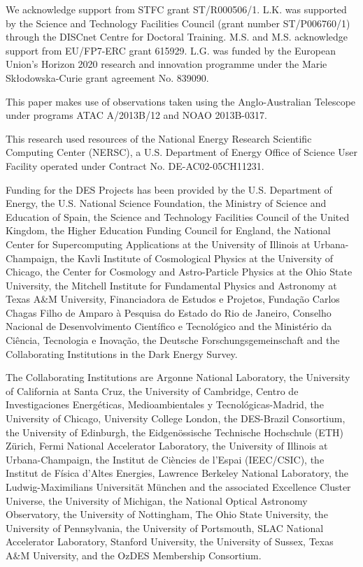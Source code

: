 \documentclass[fleqn,usenatbib,]{mnras}
\begin{document}
We acknowledge support from STFC grant ST/R000506/1. L.K. was supported by the Science and Technology Facilities Council (grant number ST/P006760/1) through the DISCnet Centre for Doctoral Training. M.S. and M.S. acknowledge support from EU/FP7-ERC grant 615929. L.G. was funded by the European Union's Horizon 2020 research and innovation programme under the Marie Sk\l{}odowska-Curie grant agreement No. 839090.

This paper makes use of observations taken using the Anglo-Australian Telescope under programs ATAC A/2013B/12 and NOAO 2013B-0317.

This research used resources of the National Energy Research Scientific Computing Center (NERSC), a U.S. Department of Energy Office of Science User Facility operated under Contract No. DE-AC02-05CH11231.

Funding for the DES Projects has been provided by the U.S. Department of Energy, the U.S. National Science Foundation, the Ministry of Science and Education of Spain, 
the Science and Technology Facilities Council of the United Kingdom, the Higher Education Funding Council for England, the National Center for Supercomputing 
Applications at the University of Illinois at Urbana-Champaign, the Kavli Institute of Cosmological Physics at the University of Chicago, 
the Center for Cosmology and Astro-Particle Physics at the Ohio State University,
the Mitchell Institute for Fundamental Physics and Astronomy at Texas A\&M University, Financiadora de Estudos e Projetos, 
Funda{\c c}{\~a}o Carlos Chagas Filho de Amparo {\`a} Pesquisa do Estado do Rio de Janeiro, Conselho Nacional de Desenvolvimento Cient{\'i}fico e Tecnol{\'o}gico and 
the Minist{\'e}rio da Ci{\^e}ncia, Tecnologia e Inova{\c c}{\~a}o, the Deutsche Forschungsgemeinschaft and the Collaborating Institutions in the Dark Energy Survey. 

The Collaborating Institutions are Argonne National Laboratory, the University of California at Santa Cruz, the University of Cambridge, Centro de Investigaciones Energ{\'e}ticas, 
Medioambientales y Tecnol{\'o}gicas-Madrid, the University of Chicago, University College London, the DES-Brazil Consortium, the University of Edinburgh, 
the Eidgen{\"o}ssische Technische Hochschule (ETH) Z{\"u}rich, 
Fermi National Accelerator Laboratory, the University of Illinois at Urbana-Champaign, the Institut de Ci{\`e}ncies de l'Espai (IEEC/CSIC), 
the Institut de F{\'i}sica d'Altes Energies, Lawrence Berkeley National Laboratory, the Ludwig-Maximilians Universit{\"a}t M{\"u}nchen and the associated Excellence Cluster Universe, 
the University of Michigan, the National Optical Astronomy Observatory, the University of Nottingham, The Ohio State University, the University of Pennsylvania, the University of Portsmouth, 
SLAC National Accelerator Laboratory, Stanford University, the University of Sussex, Texas A\&M University, and the OzDES Membership Consortium.
\end{document}
